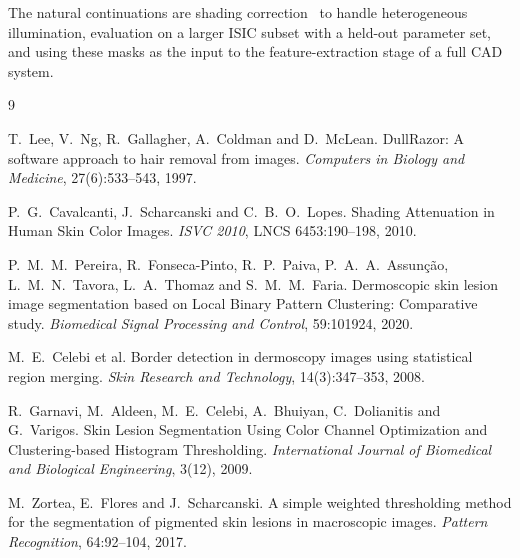 \documentclass[11pt,a4paper]{article}
\begin{document}
The natural continuations are shading correction~\cite{cavalcanti} to handle
heterogeneous illumination, evaluation on a larger ISIC subset with a held-out
parameter set, and using these masks as the input to the feature-extraction
stage of a full CAD system.

\begin{thebibliography}{9}

T.~Lee, V.~Ng, R.~Gallagher, A.~Coldman and D.~McLean.
\newblock DullRazor: A software approach to hair removal from images.
\newblock \emph{Computers in Biology and Medicine}, 27(6):533--543, 1997.

P.~G.~Cavalcanti, J.~Scharcanski and C.~B.~O.~Lopes.
\newblock Shading Attenuation in Human Skin Color Images.
\newblock \emph{ISVC 2010}, LNCS 6453:190--198, 2010.

P.~M.~M.~Pereira, R.~Fonseca-Pinto, R.~P.~Paiva, P.~A.~A.~Assunção,
L.~M.~N.~Tavora, L.~A.~Thomaz and S.~M.~M.~Faria.
\newblock Dermoscopic skin lesion image segmentation based on Local Binary
Pattern Clustering: Comparative study.
\newblock \emph{Biomedical Signal Processing and Control}, 59:101924, 2020.

M.~E.~Celebi et al.
\newblock Border detection in dermoscopy images using statistical region
merging.
\newblock \emph{Skin Research and Technology}, 14(3):347--353, 2008.

R.~Garnavi, M.~Aldeen, M.~E.~Celebi, A.~Bhuiyan, C.~Dolianitis and G.~Varigos.
\newblock Skin Lesion Segmentation Using Color Channel Optimization and
Clustering-based Histogram Thresholding.
\newblock \emph{International Journal of Biomedical and Biological
Engineering}, 3(12), 2009.

M.~Zortea, E.~Flores and J.~Scharcanski.
\newblock A simple weighted thresholding method for the segmentation of
pigmented skin lesions in macroscopic images.
\newblock \emph{Pattern Recognition}, 64:92--104, 2017.

\end{thebibliography}
\end{document}

